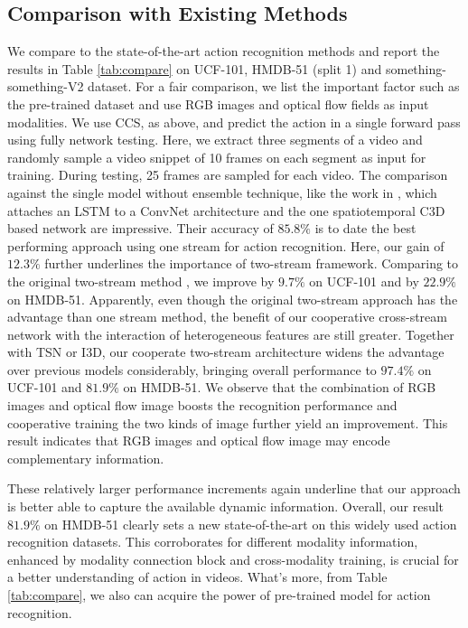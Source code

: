 \documentclass[conference,compsoc]{IEEEtran}
\begin{document}
\subsection{Comparison with Existing Methods}
We compare to the state-of-the-art action recognition methods and report the results in Table \ref{tab:compare} on UCF-101, HMDB-51 (split 1) and something-something-V2 dataset. For a fair comparison, we list the important factor such as the pre-trained dataset and use RGB images and optical flow fields as input modalities. We use CCS, as above, and predict the action in a single forward pass using fully network testing. Here, we extract three segments of a video and randomly sample a video snippet of 10 frames on each segment as input for training. During testing, 25 frames are sampled for each video. The comparison against the single model without ensemble technique, like the work in \cite{donahue2015long}, which attaches an LSTM to a ConvNet architecture and the one spatiotemporal C3D based network \cite{tran2017convnet} are impressive. Their accuracy of $85.8\%$ is to date the best performing approach using one stream for action recognition. Here, our gain of $12.3\%$ further underlines the importance of two-stream framework. Comparing to the original two-stream method \cite{simonyan2014two}, we improve by $9.7\%$ on UCF-101 and by $22.9 \% $on HMDB-51. Apparently, even though the original two-stream approach has the advantage than one stream method, the benefit of our cooperative cross-stream network with the interaction of heterogeneous features are still greater. Together with TSN or I3D, our cooperate two-stream architecture widens the advantage over previous models considerably, bringing overall performance to $97.4\%$ on UCF-101 and $81.9\%$ on HMDB-51. We observe that the combination of RGB images and optical flow image boosts the recognition performance and cooperative training the two kinds of image further yield an improvement. This result indicates that RGB images and optical flow image may encode complementary information.

These relatively larger performance increments again underline that our approach is better able to capture the available dynamic information. Overall, our result $81.9\%$ on HMDB-51 clearly sets a new state-of-the-art on this widely used action recognition datasets. This corroborates for different modality information, enhanced by modality connection block and cross-modality training, is crucial for a better understanding of action in videos. What's more, from Table \ref{tab:compare}, we also can acquire the power of pre-trained model for action recognition.
\end{document}

